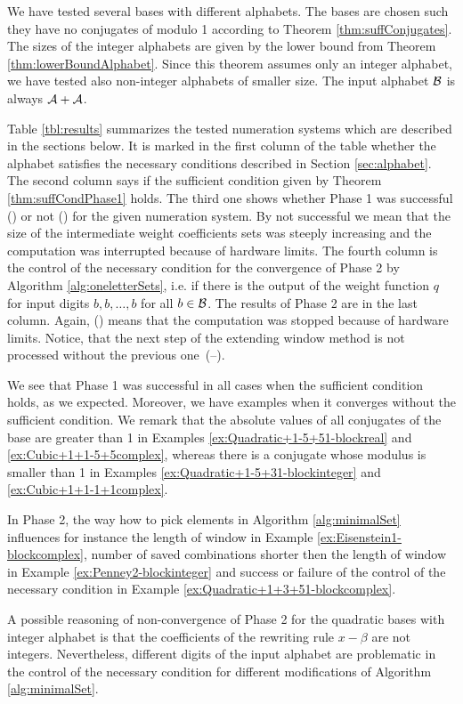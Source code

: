 We have tested several bases with different alphabets. The bases are chosen such they have no conjugates of modulo 1 according to Theorem \ref{thm:suffConjugates}. The sizes of the integer alphabets are given by the lower bound from Theorem \ref{thm:lowerBoundAlphabet}. Since this theorem assumes only an integer alphabet, we have tested also non-integer alphabets of smaller size. The input alphabet $\mathcal{B}$ is always $\mathcal{A}+ \mathcal{A}$.  

 Table \ref{tbl:results} summarizes the tested numeration systems which are described in the sections below. It is marked in the first column of the table whether the alphabet satisfies the necessary conditions described in Section \ref{sec:alphabet}. The second column says if the sufficient condition given by Theorem \ref{thm:suffCondPhase1} holds. The third one shows whether Phase 1 was successful (\checkmark) or not (\xmark) for the given numeration system. By not successful we mean that the size of the intermediate weight coefficients sets was steeply increasing and the computation was interrupted because of hardware limits. The fourth column is the control of the necessary condition for the convergence of Phase 2 by Algorithm \ref{alg:oneletterSets}, i.e. if there is the output of the weight function $q$ for input digits $b,b,\dots,b$ for all $b\in\mathcal{B}$. The results of Phase 2 are in the last column. Again, (\xmark) means that the computation was stopped because of hardware limits. Notice, that the next step of the extending window method is not processed without the previous one~(--).

We see that Phase 1 was successful in all cases when the sufficient condition holds, as we expected. Moreover, we have examples when it converges without the sufficient condition. We remark that the absolute values of all conjugates of the base are greater than 1 in Examples \ref{ex:Quadratic+1-5+51-blockreal} and \ref{ex:Cubic+1+1-5+5complex}, whereas there is a conjugate whose modulus is smaller than 1 in Examples \ref{ex:Quadratic+1-5+31-blockinteger} and \ref{ex:Cubic+1+1-1+1complex}.


In Phase 2, the way how to pick elements in Algorithm \ref{alg:minimalSet} influences for instance the length of window in Example \ref{ex:Eisenstein1-blockcomplex}, number of saved combinations shorter then the length of window in Example  \ref{ex:Penney2-blockinteger} and success or failure of the control of the necessary condition in Example \ref{ex:Quadratic+1+3+51-blockcomplex}.
 
A possible reasoning of non-convergence of Phase 2 for the quadratic bases with integer alphabet is that the coefficients of the rewriting rule $x-\beta$ are not integers. Nevertheless, different digits of the input alphabet are problematic in the control of the necessary condition for different modifications of Algorithm \ref{alg:minimalSet}.

